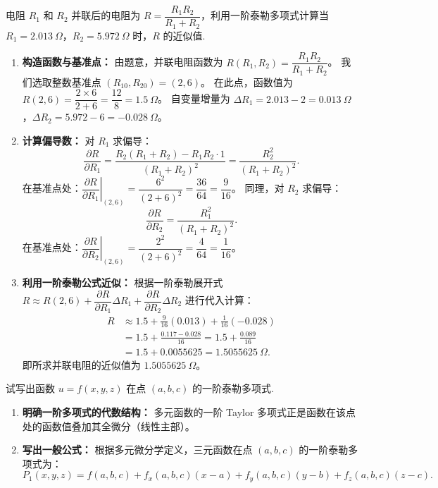 \documentclass[lang=cn,11pt]{elegantbook}
\begin{document}
\begin{exercise}
电阻 $R_1$ 和 $R_2$ 并联后的电阻为 $R = \dfrac{R_1R_2}{R_1+R_2}$，利用一阶泰勒多项式计算当 $R_1 = 2.013\ \Omega$，$R_2 = 5.972\ \Omega$ 时，$R$ 的近似值.
\end{exercise}
\begin{solution}
\begin{enumerate}
  \item \textbf{构造函数与基准点：}
  由题意，并联电阻函数为 $R(R_1, R_2) = \dfrac{R_1R_2}{R_1+R_2}$。
  我们选取整数基准点 $(R_{10}, R_{20}) = (2, 6)$。
  在此点，函数值为 $R(2, 6) = \dfrac{2 \times 6}{2 + 6} = \dfrac{12}{8} = 1.5\ \Omega$。
  自变量增量为 $\Delta R_1 = 2.013 - 2 = 0.013\ \Omega$，$\Delta R_2 = 5.972 - 6 = -0.028\ \Omega$。
  
  \item \textbf{计算偏导数：}
  对 $R_1$ 求偏导：
  \[
  \frac{\partial R}{\partial R_1} = \frac{R_2(R_1+R_2) - R_1R_2 \cdot 1}{(R_1+R_2)^2} = \frac{R_2^2}{(R_1+R_2)^2}.
  \]
  在基准点处：$\left. \dfrac{\partial R}{\partial R_1} \right|_{(2,6)} = \dfrac{6^2}{(2+6)^2} = \dfrac{36}{64} = \dfrac{9}{16}$。
  同理，对 $R_2$ 求偏导：
  \[
  \frac{\partial R}{\partial R_2} = \frac{R_1^2}{(R_1+R_2)^2}.
  \]
  在基准点处：$\left. \dfrac{\partial R}{\partial R_2} \right|_{(2,6)} = \dfrac{2^2}{(2+6)^2} = \dfrac{4}{64} = \dfrac{1}{16}$。
  
  \item \textbf{利用一阶泰勒公式近似：}
  根据一阶泰勒展开式 $R \approx R(2,6) + \dfrac{\partial R}{\partial R_1}\Delta R_1 + \dfrac{\partial R}{\partial R_2}\Delta R_2$ 进行代入计算：
  \begin{align*}
  R &\approx 1.5 + \frac{9}{16}(0.013) + \frac{1}{16}(-0.028) \\
  &= 1.5 + \frac{0.117 - 0.028}{16} = 1.5 + \frac{0.089}{16} \\
  &= 1.5 + 0.0055625 = 1.5055625\ \Omega.
  \end{align*}
  即所求并联电阻的近似值为 $1.5055625\ \Omega$。
\end{enumerate}
\end{solution}

\begin{exercise}
试写出函数 $u = f(x,y,z)$ 在点 $(a,b,c)$ 的一阶泰勒多项式.
\end{exercise}
\begin{solution}
\begin{enumerate}
  \item \textbf{明确一阶多项式的代数结构：}
  多元函数的一阶 Taylor 多项式正是函数在该点处的函数值叠加其全微分（线性主部）。
  \item \textbf{写出一般公式：}
  根据多元微分学定义，三元函数在点 $(a,b,c)$ 的一阶泰勒多项式为：
  \[
  P_1(x,y,z) = f(a,b,c) + f_x(a,b,c)(x-a) + f_y(a,b,c)(y-b) + f_z(a,b,c)(z-c).
  \]
\end{enumerate}
\end{solution}
\end{document}
